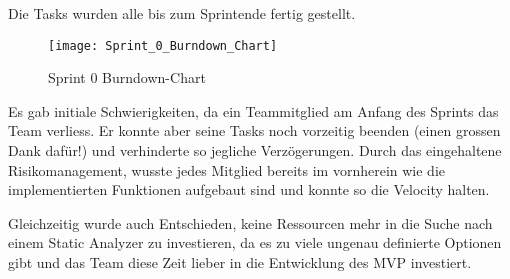 \documentclass[../main.tex]{subfiles}
\begin{document}
	\par Die Tasks wurden alle bis zum Sprintende fertig gestellt.
	
	\begin{figure}[H]
		\centering
		\texttt{[image: Sprint\_0\_Burndown\_Chart]}
		\caption{Sprint 0 Burndown-Chart}
	\end{figure}

	\par Es gab initiale Schwierigkeiten, da ein Teammitglied am Anfang des Sprints das Team verliess. Er konnte aber seine Tasks noch vorzeitig beenden (einen grossen Dank dafür!) und verhinderte so jegliche Verzögerungen. Durch das eingehaltene Risikomanagement, wusste jedes Mitglied bereits im vornherein wie die implementierten Funktionen aufgebaut sind und konnte so die Velocity halten.
	
	\par Gleichzeitig wurde auch Entschieden, keine Ressourcen mehr in die Suche nach einem Static Analyzer zu investieren, da es zu viele ungenau definierte Optionen gibt und das Team diese Zeit lieber in die Entwicklung des MVP investiert.
\end{document}
